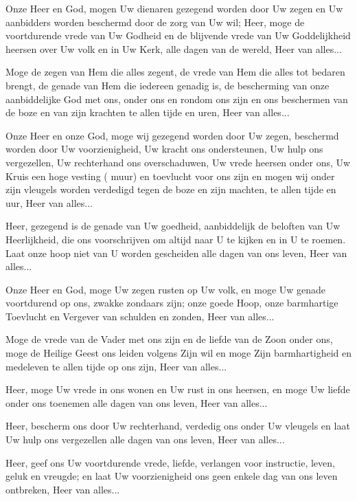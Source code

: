 \documentclass[12pt,twoside,a5paper]{article}
\begin{document}
 Onze Heer en God, mogen Uw dienaren gezegend worden door Uw zegen en Uw aanbidders worden beschermd door de zorg van Uw wil; Heer, moge de voortdurende vrede van Uw Godheid en de blijvende vrede van Uw Goddelijkheid heersen over Uw volk en in Uw Kerk, alle dagen van de wereld, Heer van alles...

 Moge de zegen van Hem die alles zegent, de vrede van Hem die alles tot bedaren brengt, de genade van Hem die iedereen genadig is, de bescherming van onze aanbiddelijke God met ons, onder ons en rondom ons zijn en ons beschermen van de boze en van zijn krachten te allen tijde en uren, Heer van alles...

 Onze Heer en onze God, moge wij gezegend worden door Uw zegen, beschermd worden door Uw voorzienigheid, Uw kracht ons ondersteunen, Uw hulp ons vergezellen, Uw rechterhand ons overschaduwen, Uw vrede heersen onder ons, Uw Kruis een hoge vesting ( muur) en toevlucht voor ons zijn en mogen wij onder zijn vleugels worden verdedigd tegen de boze en zijn machten, te allen tijde en uur, Heer van alles...

 Heer, gezegend is de genade van Uw goedheid, aanbiddelijk de beloften van Uw Heerlijkheid, die ons voorschrijven om altijd naar U te kijken en in U te roemen. Laat onze hoop niet van U worden gescheiden alle dagen van ons leven, Heer van alles...

 Onze Heer en God, moge Uw zegen rusten op Uw volk, en moge Uw genade voortdurend op ons, zwakke zondaars zijn; onze goede Hoop, onze barmhartige Toevlucht en Vergever van schulden en zonden, Heer van alles...

 Moge de vrede van de Vader met ons zijn en de liefde van de Zoon onder ons, moge de Heilige Geest ons leiden volgens Zijn wil en moge Zijn barmhartigheid en medeleven te allen tijde op ons zijn, Heer van alles...

 Heer, moge Uw vrede in ons wonen en Uw rust in ons heersen, en moge Uw liefde onder ons toenemen alle dagen van ons leven, Heer van alles...

 Heer, bescherm ons door Uw rechterhand, verdedig ons onder Uw vleugels en laat Uw hulp ons vergezellen alle dagen van ons leven, Heer van alles...

 Heer, geef ons Uw voortdurende vrede, liefde, verlangen voor instructie, leven, geluk en vreugde; en laat Uw voorzienigheid ons geen enkele dag van ons leven ontbreken, Heer van alles...
\end{document}
